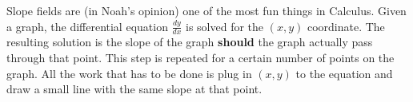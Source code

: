 \documentclass[../revisedmain.tex]{subfiles}
\begin{document}
	Slope fields are (in Noah's opinion) one of the most fun things in Calculus. Given a graph, the differential equation $\displaystyle\frac{dy}{dx}$ is solved for the $(x,y)$ coordinate. The resulting solution is the slope of the graph \textbf{should} the graph actually pass through that point. This step is repeated for a certain number of points on the graph. All the work that has to be done is plug in $(x,y)$ to the equation and draw a small line with the same slope at that point.\\
\end{document}
